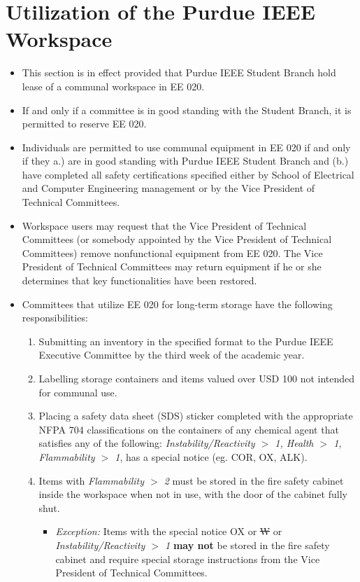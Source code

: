 \documentclass[12pt]{constitution}
\begin{document}
\section{Utilization of the Purdue IEEE Workspace}
\label{sec:tech_workspace}
\begin{itemize}
    \item This section is in effect provided that Purdue IEEE Student Branch hold lease of a communal workspace in EE 020.
    \item If and only if a committee is in good standing with the Student Branch, it is permitted to reserve EE 020.
    \item Individuals are permitted to use communal equipment in EE 020 if and only if they a.) are in good standing with Purdue IEEE Student Branch and (b.) have completed all safety certifications specified either by School of Electrical and Computer Engineering management or by the Vice President of Technical Committees.
    \item Workspace users may request that the Vice President of Technical Committees (or somebody appointed by the Vice President of Technical Committees) remove nonfunctional equipment from EE 020. The Vice President of Technical Committees may return equipment if he or she determines that key functionalities have been restored.
    \item Committees that utilize EE 020 for long-term storage have the following responsibilities:
    \begin{enumerate}
        \item Submitting an inventory in the specified format to the Purdue IEEE Executive Committee by the third week of the academic year.
        \item Labelling storage containers and items valued over USD 100 not intended for communal use.
        \item Placing a safety data sheet (SDS) sticker completed with the appropriate NFPA 704 classifications on the containers of any chemical agent that satisfies any of the following: \emph{Instability/Reactivity $>$ 1, Health $>$ 1, Flammability $>$ 1}, has a special notice (eg. COR, OX, ALK).
        \item Items with \emph{Flammability $>$ 2} must be stored in the fire safety cabinet inside the workspace when not in use, with the door of the cabinet fully shut.
        \begin{itemize}
            \item \emph{Exception:} Items with the special notice OX or \st{W} or \emph{Instability/Reactivity $>$ 1} \textbf{may not} be stored in the fire safety cabinet and require special storage instructions from the Vice President of Technical Committees. 

\end{itemize}
\end{enumerate}
\end{itemize}
\end{document}
